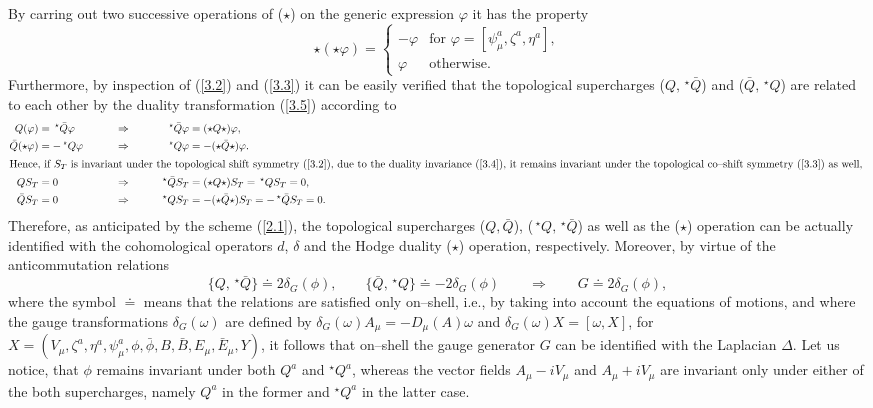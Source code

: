 \documentclass[a4paper,11pt]{article}
\begin{document}
By carring out two successive operations of ($\star$) on the generic 
expression $\varphi$ it has the property 
\begin{equation*}
\star (\star \varphi) = \begin{cases} - \varphi & 
\text{for $\varphi = [ \psi_\mu^a, \zeta^a, \eta^a ]$}, \\
\varphi & \text{otherwise}. \end{cases}
\end{equation*}
Furthermore, by inspection of (\ref{3.2}) and (\ref{3.3}) it can be easily 
verified that the topological supercharges ($Q, \,^\star \bar{Q}$) and
($\bar{Q}, \,^\star Q$) are related to each other by the duality transformation
(\ref{3.5}) according to 
\begin{alignat*}{3}
Q ( \varphi) &= \,^\star \bar{Q} \varphi
&\qquad
&\Rightarrow
&\qquad
\,^\star \bar{Q} \varphi &= (\star Q \star) \varphi,
\\
\bar{Q} (\star \varphi) &= - \,^\star Q \varphi
&\qquad
&\Rightarrow
&\qquad
\,^\star Q \varphi &= - (\star \bar{Q} \star) \varphi.
\\
\intertext{Hence, if $S_T$ is invariant under the topological shift 
symmetry (\ref{3.2}), due to the duality invariance (\ref{3.4}), it 
remains 
invariant under the topological co--shift symmetry (\ref{3.3}) as well,
}
Q S_T &= 0 
&\qquad
&\Rightarrow
&\qquad
\,^\star \bar{Q} S_T &= (\star Q \star) S_T = \,^\star Q S_T = 0,
\\
\bar{Q} S_T &= 0 
&\qquad
&\Rightarrow
&\qquad
\,^\star Q S_T &= - (\star \bar{Q} \star) S_T = - \,^\star \bar{Q} S_T = 0.
\end{alignat*}
Therefore, as anticipated by the scheme (\ref{2.1}), the topological 
supercharges ($Q, \bar{Q}$), ($\,^\star Q, \,^\star \bar{Q}$) as well as the 
($\star$) operation can be actually identified with the cohomological 
operators $d$, $\delta$ and the Hodge duality ($\star$) operation, 
respectively. Moreover, by virtue of the anticommutation relations
\begin{equation*}
\{ Q, \,^\star \bar{Q} \} \doteq 2 \delta_G(\phi),
\qquad
\{ \bar{Q}, \,^\star{Q} \} \doteq - 2 \delta_G(\phi)
\qquad
\Rightarrow
\qquad
G \doteq 2 \delta_G(\phi),
\end{equation*}
where the symbol $\doteq$ means that the relations are satisfied only
on--shell, i.e., by taking into account the equations of motions, and where
the gauge transformations $\delta_G(\omega)$ are defined by
$\delta_G(\omega) A_\mu = - D_\mu(A) \omega$ and
$\delta_G(\omega) X = [\omega, X]$, for $X = ( 
V_\mu, \zeta^a, \eta^a, \psi_\mu^a, \phi, \bar{\phi}, B, \bar{B}, 
E_\mu, \bar{E}_\mu, Y )$, 
it follows that on--shell the gauge generator $G$ can be identified 
with the Laplacian $\Delta$. Let us notice, that $\phi$ remains invariant 
under both $Q^a$ and $^\star Q^a$, whereas the vector fields 
$A_\mu - i V_\mu$ and $A_\mu + i V_\mu$ are invariant only under either of
the both supercharges, namely $Q^a$ in the former and $^\star Q^a$ in
the latter case.  
\end{document}
